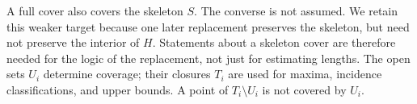 A full cover also covers the skeleton $S$. The converse is not assumed.
We retain this weaker target because one later replacement preserves the
skeleton, but need not preserve the interior of $H$. Statements about a
skeleton cover are therefore needed for the logic of the replacement, not
just for estimating lengths. The open sets $U_i$ determine coverage;
their closures $T_i$ are used for maxima, incidence classifications, and
upper bounds. A point of $T_i\setminus U_i$ is not covered by $U_i$.
